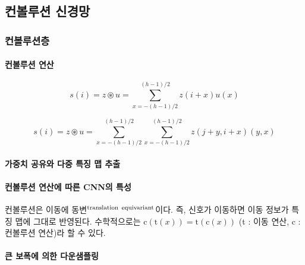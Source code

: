 \documentclass [12pt] {oblivoir}
\let\oldsubsubsection=\subsubsection
\renewcommand{\subsubsection}
{
  \filbreak
  \oldsubsubsection
}
\begin{document}
\vspace{3mm}

\subsection{컨볼루션 신경망}

\subsubsection{컨볼루션층}

\paragraph*{컨볼루션 연산}\mbox{}

\begin{equation} \tag{4.10}
  s(i) = z \circledast u = \sum_{x=-(h - 1) / 2}^{(h - 1) / 2}z(i + x)u(x)
\end{equation}

\begin{equation} \tag{4.11}
  s(i) = z \circledast u = \sum_{x=-(h - 1) / 2}^{(h - 1) / 2}\sum_{x = -(h - 1) / 2}^{(h - 1) / 2}z(j + y, i + x)(y, x)
\end{equation}

\vspace{3mm}

\paragraph*{가중치 공유와 다중 특징 맵 추출}\mbox{}

\vspace{3mm}

\paragraph*{컨볼루션 연산에 따른 CNN의 특성}\mbox{}

\vspace{3mm}

컨볼루션은 이동에 동변$^{\text{translation\, equivariant}}$이다. 즉, 신호가 이동하면 이동 정보가 특징 맵에 그대로 반영된다. 수학적으로는 $\text{c}(\text{t}(x)) = \text{t}(\text{c}(x))$ (t : 이동 연산, c : 컨볼루션 연산)라 할 수 있다.

\paragraph*{큰 보폭에 의한 다운샘플링}\mbox{}
\end{document}
